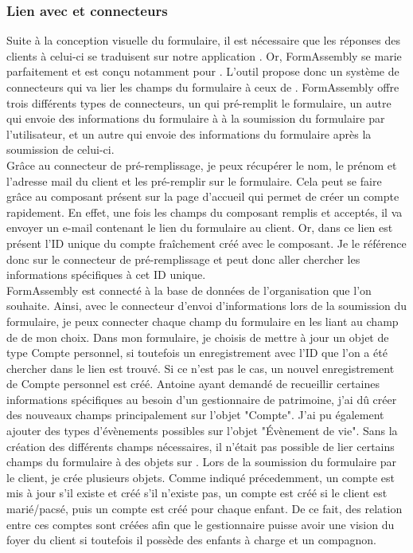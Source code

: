 \documentclass[12pt,oneside,noprintercorrection]{iut}
\begin{document}
 \subsubsection{Lien avec \slf{} et connecteurs}
 Suite à la conception visuelle du formulaire, il est nécessaire que les réponses des clients à celui-ci se traduisent sur notre application \slf{}. Or, FormAssembly se marie parfaitement et est conçu notamment pour \slf{}. L'outil propose donc un système de connecteurs qui va lier les champs du formulaire à ceux de \slf{}. FormAssembly offre trois différents types de connecteurs, un qui pré-remplit le formulaire, un autre qui envoie des informations du formulaire à \slf{} à la soumission du formulaire par l'utilisateur, et un autre qui envoie des informations du formulaire après la soumission de celui-ci.
 ~\\\indent Grâce au connecteur de pré-remplissage, je peux récupérer le nom, le prénom et l'adresse mail du client et les pré-remplir sur le formulaire. Cela peut se faire grâce au composant présent sur la page d'accueil qui permet de créer un compte rapidement. En effet, une fois les champs du composant remplis et acceptés, il va envoyer un e-mail contenant le lien du formulaire au client. Or, dans ce lien est présent l'ID unique du compte fraîchement créé avec le composant. Je le référence donc sur le connecteur de pré-remplissage et peut donc aller chercher les informations spécifiques à cet ID unique.
 ~\\\indent FormAssembly est connecté à la base de données de l'organisation \slf{} que l'on souhaite. Ainsi, avec le connecteur d'envoi d'informations lors de la soumission du formulaire, je peux connecter chaque champ du formulaire en les liant au champ de \slf{} de mon choix. Dans mon formulaire, je choisis de mettre à jour un objet de type Compte personnel, si toutefois un enregistrement avec l'ID que l'on a été chercher dans le lien est trouvé. Si ce n'est pas le cas, un nouvel enregistrement de Compte personnel est créé. Antoine ayant demandé de recueillir certaines informations spécifiques au besoin d'un gestionnaire de patrimoine, j'ai dû créer des nouveaux champs principalement sur l'objet "Compte". J'ai pu également ajouter des types d'évènements possibles sur l'objet "Évènement de vie". Sans la création des différents champs nécessaires, il n'était pas possible de lier certains champs du formulaire à des objets sur \slf{}. Lors de la soumission du formulaire par le client, je crée plusieurs objets. Comme indiqué précedemment, un compte est mis à jour s'il existe et créé s'il n'existe pas, un compte est créé si le client est marié/pacsé, puis un compte est créé pour chaque enfant. De ce fait, des relation entre ces comptes sont créées afin que le gestionnaire puisse avoir une vision du foyer du client si toutefois il possède des enfants à charge et un compagnon.
\end{document}

